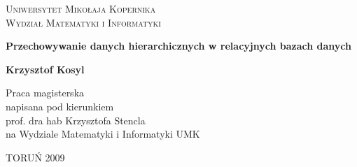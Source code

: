 


\begin{titlepage}
    \begin{center}
        \large\scshape Uniwersytet Mikołaja Kopernika\\
        Wydział Matematyki i Informatyki
    \end{center}
    \vspace{18ex}
    \begin{center}
        \Large\bfseries
        Przechowywanie danych hierarchicznych w relacyjnych bazach danych
    \end{center}
    \vspace{18ex}
    \begin{center}
        \large\bfseries
        Krzysztof Kosyl
    \end{center}
    \vspace{15ex}
    \hspace*{\fill}
    \parbox{0.56\textwidth}{\setlength{\parindent}{1em}
            \small
            \noindent
            Praca magisterska\\
            napisana pod kierunkiem\\
            prof. dra hab Krzysztofa Stencla\\
            na Wydziale Matematyki i Informatyki UMK}
    \vfill
    \centerline{TORUŃ 2009}
    \addtocounter{page}{-1}
\end{titlepage}



% 
% 
% 
% 
% 
% 
% 

